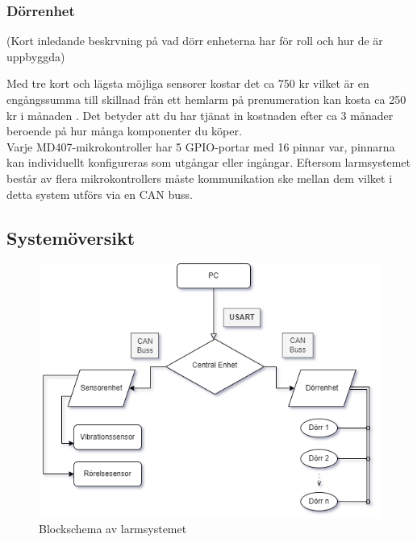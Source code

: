 \documentclass{article}
\begin{document}
\subsubsection{Dörrenhet}
(Kort inledande beskrvning på vad dörr enheterna har för roll och hur de är uppbyggda)

Med tre kort och lägsta möjliga sensorer kostar det ca 750 kr vilket är en engångssumma till skillnad från ett hemlarm på prenumeration kan kosta ca 250 kr i månaden \cite{Offerta}.
Det betyder att du har tjänat in kostnaden efter ca 3 månader beroende på hur många komponenter du köper.\\

Varje MD407-mikrokontroller har 5 GPIO-portar med 16 pinnar var, pinnarna kan individuellt konfigureras som utgångar eller ingångar.
Eftersom larmsystemet består av flera mikrokontrollers måste kommunikation ske mellan dem vilket i detta system utförs via en CAN buss.

\subsection{Systemöversikt}

\begin{figure}[h]
    \centering
    \includegraphics[scale=0.8]{Projektrapport/diagram.png}
    \caption {Blockschema av larmsystemet}
    \label{fig:drawing}
\end{figure}
\end{document}

